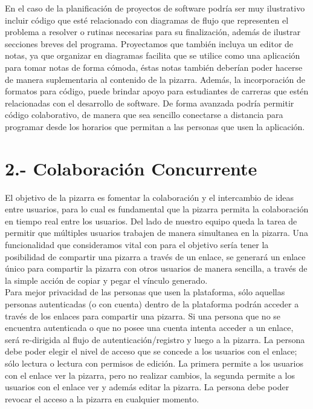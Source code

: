 \documentclass[a4paper, oneside, final]{scrartcl}
\begin{document}
En el caso de la planificación de proyectos de software podría ser muy ilustrativo incluir código que esté relacionado con diagramas de flujo que representen el problema a resolver o rutinas necesarias para su finalización, además de ilustrar secciones breves del programa. Proyectamos que también incluya un editor de notas, ya que organizar en diagramas facilita que se utilice como una
    aplicación para tomar notas de forma cómoda, éstas notas también deberían poder hacerse de manera suplementaria al contenido de la pizarra. Además, la incorporación de
    formatos para código, puede brindar apoyo para estudiantes
    de carreras que estén relacionadas con el desarrollo de software. De forma avanzada podría permitir código colaborativo, de manera que sea sencillo conectarse a distancia para programar desde los horarios que permitan a las personas que usen la aplicación.

\noindent
\section{ 2.- Colaboración Concurrente} %

 El objetivo de la pizarra es fomentar la colaboración y el intercambio de ideas entre usuarios, para lo cual es fundamental que la pizarra permita la colaboración en tiempo real entre los usuarios. Del lado de nuestro equipo queda la tarea de permitir que múltiples usuarios trabajen de manera simultanea en la pizarra. Una funcionalidad que consideramos vital con para el objetivo sería tener la posibilidad de compartir una pizarra a través de un enlace, se generará un enlace único para compartir la pizarra con otros usuarios de manera sencilla, a través de la simple acción de copiar y pegar el vínculo generado.\\


Para mejor privacidad de las personas que usen la plataforma, sólo aquellas personas autenticadas (o con cuenta) dentro de la plataforma podrán acceder a través de los enlaces para compartir una pizarra. Si una persona que no se encuentra autenticada o que no posee una cuenta intenta acceder a un enlace, será re-dirigida al flujo de autenticación/registro y luego a la pizarra. La persona debe poder elegir el nivel de acceso que se concede a los usuarios con el enlace; sólo lectura o lectura con permisos de edición. La primera permite a los usuarios con el enlace ver la pizarra, pero no realizar cambios, la segunda permite a los usuarios con el enlace ver y además editar la pizarra. La persona debe poder revocar el acceso a la pizarra en cualquier momento.\\
\end{document}
